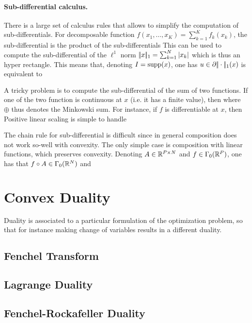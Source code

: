 \paragraph{Sub-differential calculus.}

There is a large set of calculus rules that allows to simplify the computation of sub-differentials. For decomposable function $f(x_1,\ldots,x_K)=\sum_{k=1}^K f_k(x_k)$, the sub-differential is the product of the sub-differentials
This can be used to compute the sub-differential of the $\ell^1$ norm $|\!| x |\!|_1=\sum_{k=1}^N |x_k|$
which is thus an hyper rectangle. This means that, denoting $I = \operatorname{supp}(x)$, one has $u \in \partial |\!| \cdot |\!|_1(x)$ is equivalent to 

A tricky problem is to compute the sub-differential of the sum of two functions. If one of the two function is continuous at $x$ (i.e. it has a finite value), then 
where $\oplus$ thus denotes the Minkowski sum. For instance, if $f$ is differentiable at $x$, then 
Positive linear scaling is simple to handle

The chain rule for sub-differential is difficult since in general composition does not work so-well with convexity. 
%
The only simple case is composition with linear functions, which preserves convexity. Denoting $A \in \mathbb{R}^{P \times N}$ and $f \in \Gamma_0(\mathbb{R}^P)$, one has that $f \circ A \in \Gamma_0(\mathbb{R}^N)$ and


\section{Convex Duality}

Duality is associated to a particular formulation of the optimization problem, so that for instance making change of variables results in a different duality. 

\subsection{Fenchel Transform}


\subsection{Lagrange Duality}


\subsection{Fenchel-Rockafeller Duality}
